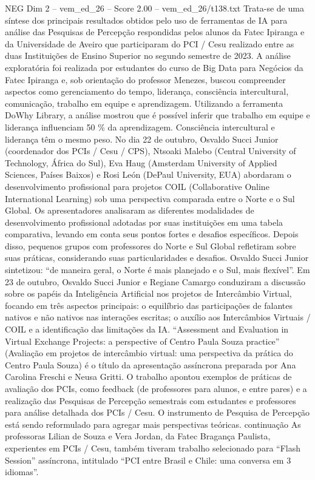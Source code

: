 \begin{textsample}{NEG Dim 2 – vem\_ed\_26 – Score 2.00 – vem\_ed\_26/t138.txt}
Trata-se de uma síntese dos principais resultados obtidos pelo uso de ferramentas de IA para análise das Pesquisas de Percepção respondidas pelos alunos da Fatec Ipiranga e da Universidade de Aveiro que participaram do PCI / Cesu realizado entre as duas Instituições de Ensino Superior no segundo semestre de 2023.
A análise exploratória foi realizada por estudantes do curso de Big Data para Negócios da Fatec Ipiranga e, sob orientação do professor Menezes, buscou compreender aspectos como gerenciamento do tempo, liderança, consciência intercultural, comunicação, trabalho em equipe e aprendizagem.
Utilizando a ferramenta DoWhy Library, a análise mostrou que é possível inferir que trabalho em equipe e liderança influenciam 50 \% da aprendizagem.
Consciência intercultural e liderança têm o mesmo peso.
No dia 22 de outubro, Osvaldo Succi Junior (coordenador dos PCIs / Cesu / CPS), Ntsoaki Malebo (Central University of Technology, África do Sul), Eva Haug (Amsterdam University of Applied Sciences, Países Baixos) e Rosi León (DePaul University, EUA) abordaram o desenvolvimento profissional para projetos COIL (Collaborative Online International Learning) sob uma perspectiva comparada entre o Norte e o Sul Global.
Os apresentadores analisaram as diferentes modalidades de desenvolvimento profissional adotadas por suas instituições em uma tabela comparativa, levando em conta seus pontos fortes e desafios específicos.
Depois disso, pequenos grupos com professores do Norte e Sul Global refletiram sobre suas práticas, considerando suas particularidades e desafios.
Osvaldo Succi Junior sintetizou: “de maneira geral, o Norte é mais planejado e o Sul, mais flexível”.
Em 23 de outubro, Osvaldo Succi Junior e Regiane Camargo conduziram a discussão sobre os papéis da Inteligência Artificial nos projetos de Intercâmbio Virtual, focando em três aspectos principais: o equilíbrio das participações de falantes nativos e não nativos nas interações escritas; o auxílio aos Intercâmbios Virtuais / COIL e a identificação das limitações da IA. “Assessment and Evaluation in Virtual Exchange Projects: a perspective of Centro Paula Souza practice” (Avaliação em projetos de intercâmbio virtual: uma perspectiva da prática do Centro Paula Souza) é o título da apresentação assíncrona preparada por Ana Carolina Freschi e Neusa Gritti.
O trabalho apontou exemplos de práticas de avaliação dos PCIs, como feedback (de professores para alunos, e entre pares) e a realização das Pesquisas de Percepção semestrais com estudantes e professores para análise detalhada dos PCIs / Cesu.
O instrumento de Pesquisa de Percepção está sendo reformulado para agregar mais perspectivas teóricas. continuação As professoras Lilian de Souza e Vera Jordan, da Fatec Bragança Paulista, experientes em PCIs / Cesu, também tiveram trabalho selecionado para “Flash Session” assíncrona, intitulado “PCI entre Brasil e Chile: uma conversa em 3 idiomas”.

\end{textsample}

